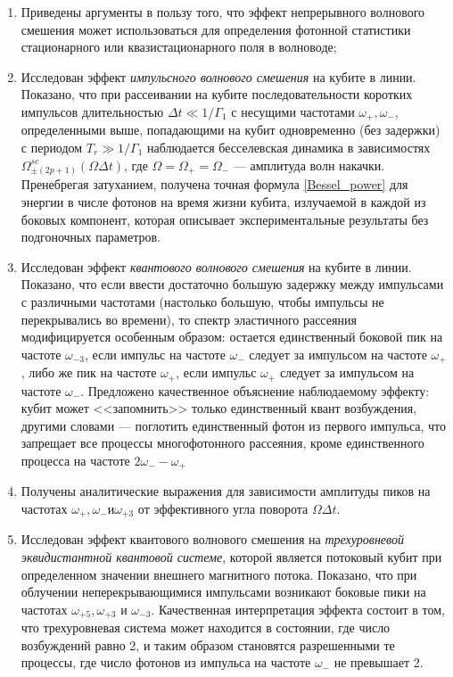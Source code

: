 \begin{enumerate}
  \item Приведены аргументы в пользу того, что эффект непрерывного волнового смешения может использоваться для определения фотонной статистики стационарного или квазистационарного поля в волноводе;
  \item Исследован эффект \textit{импульсного волнового смешения} на кубите в линии. Показано, что при рассеивании на кубите последовательности коротких импульсов длительностью $\Delta t \ll 1/\Gamma_1$ с несущими частотами $\omega_+, \omega_-$, определенными выше, попадающими на кубит одновременно (без задержки) с периодом $T_r \gg 1/\Gamma_1$ наблюдается бесселевская динамика в зависимостях $\Omega^{sc}_{\pm(2p+1)}(\Omega \Delta t)$, где $\Omega=\Omega_+=\Omega_-$ --- амплитуда волн накачки. Пренебрегая затуханием, получена точная формула \eqref{Bessel_power} для энергии в числе фотонов на время жизни кубита, излучаемой в каждой из боковых компонент, которая описывает экспериментальные результаты без подгоночных параметров. 
  \item Исследован эффект \textit{квантового волнового смешения} на кубите в линии. Показано, что если ввести достаточно большую задержку между импульсами с различными частотами (настолько большую, чтобы импульсы не перекрывались во времени), то спектр эластичного рассеяния модифицируется особенным образом: остается единственный боковой пик на частоте $\omega_{-3}$, если импульс на частоте $\omega_-$ следует за импульсом на частоте $\omega_+$, либо же пик на частоте $\omega_+$, если импульс $\omega_+$ следует за импульсом на частоте $\omega_-$. Предложено качественное объяснение наблюдаемому эффекту: кубит может <<запомнить>> только единственный квант возбуждения, другими словами --- поглотить единственный фотон из первого импульса, что запрещает все процессы многофотонного рассеяния, кроме единственного процесса на частоте $2\omega_--\omega_+$
  \item Получены аналитические выражения для зависимости амплитуды пиков на частотах $\omega_+, \omega_- \text{и} \omega_{+3}$ от эффективного угла поворота $\Omega\Delta t$.
  \item Исследован эффект квантового волнового смешения на \textit{трехуровневой эквидистантной квантовой системе}, которой является потоковый кубит при определенном значении внешнего магнитного потока. Показано, что при облучении неперекрывающимися импульсами возникают боковые пики на частотах $\omega_{+5}, \omega_{+3} \text{ и } \omega_{-3}$. Качественная интерпретация эффекта состоит в том, что трехуровневая система может находится в состоянии, где число возбуждений равно 2, и таким образом становятся разрешенными те процессы, где число фотонов из импульса на частоте $\omega_-$ не превышает 2.

\end{enumerate}
